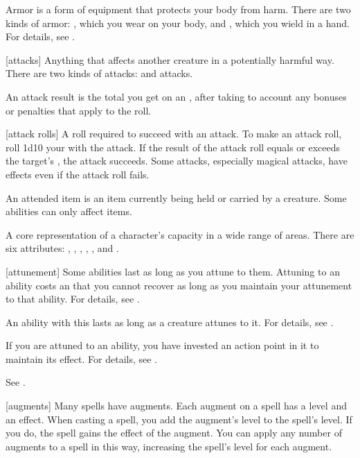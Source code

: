  Armor is a form of equipment that protects your body from harm.
There are two kinds of armor: , which you wear on your body, and , which you wield in a hand.
For details, see .

[attacks] Anything that affects another creature in a potentially harmful way. There are two kinds of attacks:  and  attacks.

 An attack result is the total you get on an , after taking to account any bonuses or penalties that apply to the roll.

[attack rolls] A roll required to succeed with an attack.
To make an attack roll, roll 1d10 \add your  with the attack.
If the result of the attack roll equals or exceeds the target's , the attack succeeds.
Some attacks, especially magical attacks, have effects even if the attack roll fails.

 An attended item is an item currently being held or carried by a creature.
Some abilities can only affect  items.

 A core representation of a character's capacity in a wide range of areas. There are six attributes: , , , , , and .

[attunement] Some abilities last as long as you attune to them.
Attuning to an ability costs an  that you cannot recover as long as you maintain your attunement to that ability.
For details, see .

 An ability with this  lasts as long as a creature attunes to it.
For details, see .

 If you are attuned to an ability, you have invested an action point in it to maintain its effect.
For details, see .

 See .

[augments] Many spells have augments.
Each augment on a spell has a level and an effect.
When casting a spell, you add the augment's level to the spell's level.
If you do, the spell gains the effect of the augment.
You can apply any number of augments to a spell in this way, increasing the spell's level for each augment.

